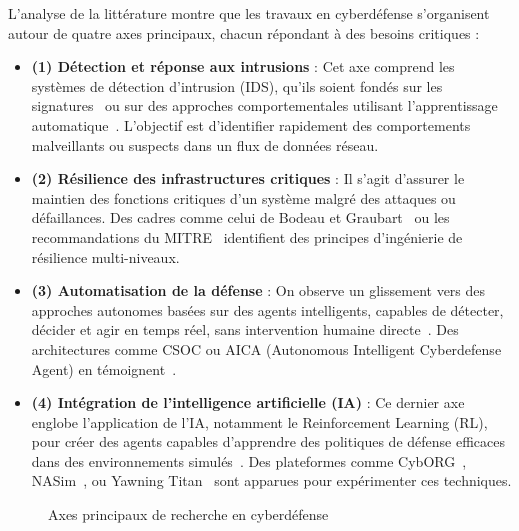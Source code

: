 \documentclass[ twoside,openright,titlepage,numbers=noenddot,headinclude,%
                footinclude=true,cleardoublepage=empty,abstractoff, %
                BCOR=5mm,paper=a4,fontsize=11pt,%
                french,american,%
                ]{scrreprt}
\begin{document}
L'analyse de la littérature montre que les travaux en cyberdéfense s'organisent autour de quatre axes principaux, chacun répondant à des besoins critiques :

\begin{itemize}
    \item \textbf{(1) Détection et réponse aux intrusions} : Cet axe comprend les systèmes de détection d'intrusion (IDS), qu'ils soient fondés sur les signatures~\cite{Axelsson2000} ou sur des approches comportementales utilisant l'apprentissage automatique~\cite{Sommer2010, Buczak2016}. L'objectif est d'identifier rapidement des comportements malveillants ou suspects dans un flux de données réseau.
    
    \item \textbf{(2) Résilience des infrastructures critiques} : Il s'agit d'assurer le maintien des fonctions critiques d'un système malgré des attaques ou défaillances. Des cadres comme celui de Bodeau et Graubart~\cite{Bodeau2011} ou les recommandations du MITRE~\cite{MITRECyberResilience2020} identifient des principes d'ingénierie de résilience multi-niveaux.

    \item \textbf{(3) Automatisation de la défense} : On observe un glissement vers des approches autonomes basées sur des agents intelligents, capables de détecter, décider et agir en temps réel, sans intervention humaine directe~\cite{Pawlick2019autodefense}. Des architectures comme CSOC ou AICA (Autonomous Intelligent Cyberdefense Agent) en témoignent~\cite{AICAGuide2022}.

    \item \textbf{(4) Intégration de l'intelligence artificielle (IA)} : Ce dernier axe englobe l'application de l'IA, notamment le Reinforcement Learning (RL), pour créer des agents capables d'apprendre des politiques de défense efficaces dans des environnements simulés~\cite{Kim2020rlcyberdefense, Smejkal2021}. Des plateformes comme CybORG~\cite{CybORG2021}, NASim~\cite{Ghanem2021NASim}, ou Yawning Titan~\cite{YawningTitan2022} sont apparues pour expérimenter ces techniques.
\end{itemize}

\begin{figure}[h]
    \centering
    \caption{Axes principaux de recherche en cyberdéfense}
    \label{fig:cyberdefense_axes}
\end{figure}
\end{document}
